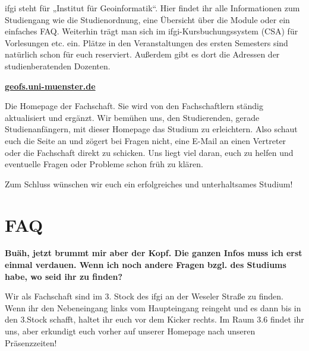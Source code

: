 ifgi steht für „Institut für Geoinformatik“. Hier ﬁndet ihr alle Informationen zum Studiengang wie die Studienordnung, eine Übersicht über die Module oder ein einfaches FAQ. Weiterhin trägt man sich im ifgi-Kursbuchungssystem (CSA) für Vorlesungen etc. ein. Plätze in den Veranstaltungen des ersten Semesters sind natürlich schon für euch reserviert. Außerdem gibt es dort die Adressen der studienberatenden Dozenten.

\begin{center}
\textbf{\url{geofs.uni-muenster.de}}\\
\end{center}

Die Homepage der Fachschaft. Sie wird von den Fachschaftlern ständig aktualisiert und ergänzt. Wir bemühen uns, den Studierenden, gerade Studienanfängern, mit dieser Homepage das Studium zu erleichtern. Also schaut euch die Seite an und zögert bei Fragen nicht, eine E-Mail an einen Vertreter oder die Fachschaft direkt zu schicken. Uns liegt viel daran, euch zu helfen und eventuelle Fragen oder Probleme schon früh zu klären. 

Zum Schluss wünschen wir euch ein erfolgreiches und unterhaltsames Studium!

\newpage

\section*{FAQ} %
\textbf{Buäh, jetzt brummt mir aber der Kopf. Die ganzen Infos muss ich erst einmal verdauen. Wenn ich noch andere Fragen bzgl. des Studiums habe, wo seid ihr zu finden?}

Wir als Fachschaft sind im 3. Stock des ifgi an der Weseler Straße zu finden. Wenn ihr den Nebeneingang links vom Haupteingang reingeht und es dann bis in den 3.Stock schafft, haltet ihr euch vor dem Kicker rechts. Im Raum 3.6 findet ihr uns, aber erkundigt euch vorher auf unserer Homepage nach unseren Präsenzzeiten!\\



